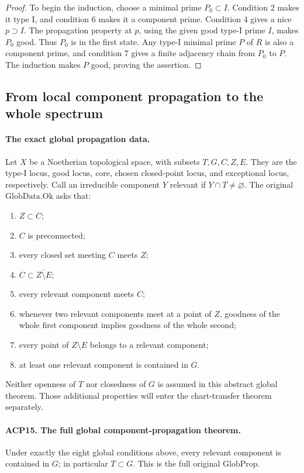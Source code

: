 \begin{proof}
To begin the induction, choose a minimal prime \(P_0\subset I\).
Condition 2 makes it type I, and condition 6 makes it a
component prime.  Condition 4 gives a nice \(p\supset I\).
The propagation property at \(p\), using the given good
type-I prime \(I\), makes \(P_0\) good.  Thus \(P_0\) is in
the first state.  Any type-I minimal prime \(P\) of \(R\)
is also a component prime, and condition 7 gives a finite
adjacency chain from \(P_0\) to \(P\).  The induction makes
\(P\) good, proving the assertion.
\end{proof}

\subsection{From local component propagation to the whole spectrum}

\paragraph{The exact global propagation data.}
Let \(X\) be a Noetherian topological space, with subsets
\(T,G,C,Z,E\).  They are the type-I locus, good locus, core,
chosen closed-point locus, and exceptional locus, respectively.
Call an irreducible component \(Y\) relevant if \(Y\cap T\ne\varnothing\).
The original \(\mathrm{GlobData.Ok}\) asks that:
\begin{enumerate}
\item \(Z\subset C\);
\item \(C\) is preconnected;
\item every closed set meeting \(C\) meets \(Z\);
\item \(C\subset\overline{Z\setminus E}\);
\item every relevant component meets \(C\);
\item whenever two relevant components meet at a point of \(Z\),
      goodness of the whole first component implies goodness of
      the whole second;
\item every point of \(Z\setminus E\) belongs to a relevant component;
\item at least one relevant component is contained in \(G\).
\end{enumerate}
Neither openness of \(T\) nor closedness of \(G\) is assumed
in this abstract global theorem.  Those additional properties
will enter the chart-transfer theorem separately.

\paragraph{ACP15. The full global component-propagation theorem.}
\label{claim:ACP15}
Under exactly the eight global conditions above, every relevant
component is contained in \(G\); in particular \(T\subset G\).
This is the full original \(\mathrm{GlobProp}\).

